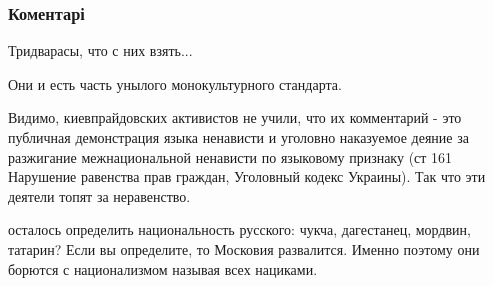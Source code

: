  
 
 
 
 
\subsubsection{Коментарі}
\label{sec:05_08_2021.fb.uljanov_anatolij.1.kievprajd_mova.cmt}

\begin{itemize}
 
Тридварасы, что с них взять...

 
Они и есть часть унылого монокультурного стандарта.

 

Видимо, киевпрайдовских активистов не учили, что их комментарий - это публичная
демонстрация языка ненависти и уголовно наказуемое деяние за разжигание
межнациональной ненависти по языковому признаку (ст 161 Нарушение равенства
прав граждан, Уголовный кодекс Украины). Так что эти деятели топят за
неравенство.

\begin{itemize}
 

осталось определить национальность русского: чукча, дагестанец, мордвин,
татарин? Если вы определите, то Московия развалится. Именно поэтому они борются
с национализмом называя всех нациками.


\end{itemize}
\end{itemize}
